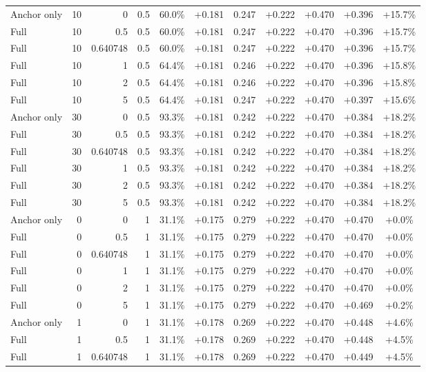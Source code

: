 \begin{table}[htbp]
\begin{tabular}{lrrrccccccc}
Anchor only & 10 & 0 & 0.5 & 60.0\% & +0.181 & 0.247 & +0.222 & +0.470 & +0.396 & +15.7\% \\
Full & 10 & 0.5 & 0.5 & 60.0\% & +0.181 & 0.247 & +0.222 & +0.470 & +0.396 & +15.7\% \\
Full & 10 & 0.640748 & 0.5 & 60.0\% & +0.181 & 0.247 & +0.222 & +0.470 & +0.396 & +15.7\% \\
Full & 10 & 1 & 0.5 & 64.4\% & +0.181 & 0.246 & +0.222 & +0.470 & +0.396 & +15.8\% \\
Full & 10 & 2 & 0.5 & 64.4\% & +0.181 & 0.246 & +0.222 & +0.470 & +0.396 & +15.8\% \\
Full & 10 & 5 & 0.5 & 64.4\% & +0.181 & 0.247 & +0.222 & +0.470 & +0.397 & +15.6\% \\
Anchor only & 30 & 0 & 0.5 & 93.3\% & +0.181 & 0.242 & +0.222 & +0.470 & +0.384 & +18.2\% \\
Full & 30 & 0.5 & 0.5 & 93.3\% & +0.181 & 0.242 & +0.222 & +0.470 & +0.384 & +18.2\% \\
Full & 30 & 0.640748 & 0.5 & 93.3\% & +0.181 & 0.242 & +0.222 & +0.470 & +0.384 & +18.2\% \\
Full & 30 & 1 & 0.5 & 93.3\% & +0.181 & 0.242 & +0.222 & +0.470 & +0.384 & +18.2\% \\
Full & 30 & 2 & 0.5 & 93.3\% & +0.181 & 0.242 & +0.222 & +0.470 & +0.384 & +18.2\% \\
Full & 30 & 5 & 0.5 & 93.3\% & +0.181 & 0.242 & +0.222 & +0.470 & +0.384 & +18.2\% \\
Anchor only & 0 & 0 & 1 & 31.1\% & +0.175 & 0.279 & +0.222 & +0.470 & +0.470 & +0.0\% \\
Full & 0 & 0.5 & 1 & 31.1\% & +0.175 & 0.279 & +0.222 & +0.470 & +0.470 & +0.0\% \\
Full & 0 & 0.640748 & 1 & 31.1\% & +0.175 & 0.279 & +0.222 & +0.470 & +0.470 & +0.0\% \\
Full & 0 & 1 & 1 & 31.1\% & +0.175 & 0.279 & +0.222 & +0.470 & +0.470 & +0.0\% \\
Full & 0 & 2 & 1 & 31.1\% & +0.175 & 0.279 & +0.222 & +0.470 & +0.470 & +0.0\% \\
Full & 0 & 5 & 1 & 31.1\% & +0.175 & 0.279 & +0.222 & +0.470 & +0.469 & +0.2\% \\
Anchor only & 1 & 0 & 1 & 31.1\% & +0.178 & 0.269 & +0.222 & +0.470 & +0.448 & +4.6\% \\
Full & 1 & 0.5 & 1 & 31.1\% & +0.178 & 0.269 & +0.222 & +0.470 & +0.448 & +4.5\% \\
Full & 1 & 0.640748 & 1 & 31.1\% & +0.178 & 0.269 & +0.222 & +0.470 & +0.449 & +4.5\% \\

\end{tabular}
\end{table}
